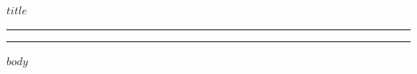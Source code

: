 \documentclass[10pt]{article}
\begin{document}
\begin{center}
{\LARGE\bfseries $title$}
\end{center}

\vspace{2mm}
\hrule
\vspace{1mm}
\hrule
\vspace{5mm}

$body$
\end{document}
